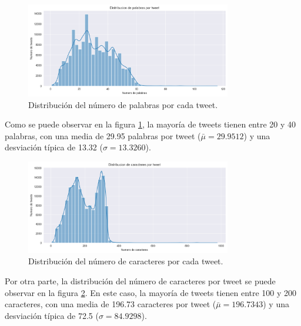 \documentclass[a4paper, 12pt]{report}
\begin{document}
                        \begin{figure}[H]
                                \centering
                                \includegraphics[width=0.8\textwidth]{resources/images/words_per_tweet_distr.png}
                                \caption{Distribución del número de palabras por cada tweet.}
                                \label{fig:word_count_distribution}
                        \end{figure}

                        Como se puede observar en la figura \ref{fig:word_count_distribution}, la mayoría de tweets tienen entre 20 y 40 palabras, con una media de 29.95 palabras por tweet (\(\bar{\mu} = 29.9512\)) y una desviación típica de 13.32 (\(\sigma = 13.3260\)).\\

                        \begin{figure}[H]
                                \centering
                                \includegraphics[width=0.8\textwidth]{resources/images/character_per_tweet_distr.png}
                                \caption{Distribución del número de caracteres por cada tweet.}
                                \label{fig:character_count_distribution}
                        \end{figure}

                        Por otra parte, la distribución del número de caracteres por tweet se puede observar en la figura \ref{fig:character_count_distribution}. En este caso, la mayoría de tweets tienen entre 100 y 200 caracteres, con una media de 196.73 caracteres por tweet (\(\bar{\mu} = 196.7343\)) y una desviación típica de 72.5 (\(\sigma = 84.9298\)).\\
\end{document}
